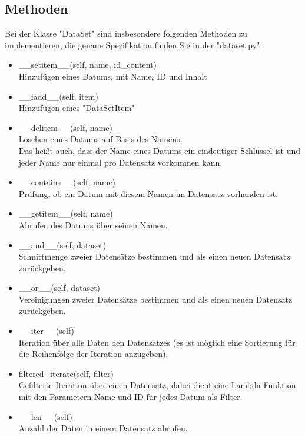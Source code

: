 \documentclass[
oneside,
12pt,
a4paper,
parskip=full
]{scrartcl}
\begin{document}
\subsection{Methoden}
Bei der Klasse "DataSet" sind insbesondere folgenden Methoden zu implementieren, die genaue Spezifikation finden Sie in der "dataset.py":\\
\begin{itemize}
	\item\_\_setitem\_\_(self, name, id\_content)\\
	 Hinzufügen eines Datums, mit Name, ID und Inhalt
	\item \_\_iadd\_\_(self, item)\\
	 Hinzufügen eines "DataSetItem"
	\item \_\_delitem\_\_(self, name)\\
	 Löschen eines Datums auf Basis des Namens.\\
	 Das heißt auch, dass der Name eines Datums ein eindeutiger Schlüssel ist und jeder Name nur einmal pro Datensatz vorkommen kann.
	\item \_\_contains\_\_(self, name)\\
	Prüfung, ob ein Datum mit diesem Namen im Datensatz vorhanden ist.
	\item \_\_getitem\_\_(self, name)\\
	Abrufen des Datums über seinen Namen.\
	\item \_\_and\_\_(self, dataset)\\
	 Schnittmenge zweier Datensätze bestimmen und als einen neuen Datensatz zurückgeben.
	\item \_\_or\_\_(self, dataset)\\
	 Vereinigungen zweier Datensätze bestimmen und als einen neuen Datensatz zurückgeben.
	\item \_\_iter\_\_(self)\\
	Iteration über alle Daten den Datensatzes (es ist möglich eine Sortierung für die Reihenfolge der Iteration anzugeben). 
	\item filtered\_iterate(self, filter)\\
	 Gefilterte Iteration über einen Datensatz, dabei dient eine Lambda-Funktion mit den Parametern Name und ID für jedes Datum als Filter.
	\item \_\_len\_\_(self)\\
	 Anzahl der Daten in einem Datensatz abrufen.\\
\end{itemize}
\end{document}
